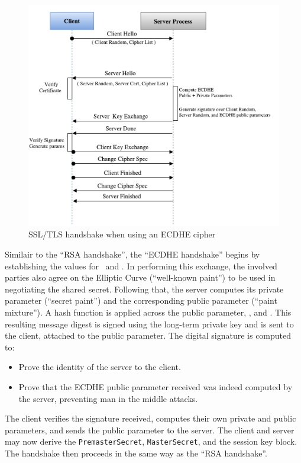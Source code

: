 \documentclass[../../main.tex]{subfiles}
\begin{document}
\begin{figure}[H]
  \centering
  \includegraphics[scale=0.4]{images/EC-DHE-Handshake-pristine.pdf}
  \caption[``ECDHE handshake'']{SSL/TLS handshake when using an ECDHE
    cipher}
  \label{fig:ecdhe-pristine}
\end{figure}

Similair to the ``RSA handshake'', the ``ECDHE handshake'' begins by
establishing the values for \crandom~and \srandom. In performing this
exchange, the involved parties also agree on the Elliptic Curve
(``well-known paint'') to be used in negotiating the shared secret.
Following that, the server computes its private parameter (``secret
paint'') and the corresponding public parameter (``paint mixture''). A
hash function is applied across the public parameter, \srandom, and
\crandom. This resulting message digest is signed using the long-term
private key and is sent to the client, attached to the public
parameter. The digital signature is computed to:
\begin{itemize}
  \item Prove the identity of the server to the client.
  \item Prove that the ECDHE public parameter received was indeed
    computed by the server, preventing man in the middle attacks. 
\end{itemize}
The client verifies the signature received, computes their own private
and public parameters, and sends the public parameter to the server.
The client and server may now derive the \texttt{PremasterSecret},
\texttt{MasterSecret}, and the session key block. The handshake then
proceeds in the same way as the ``RSA handshake''.
\end{document}
